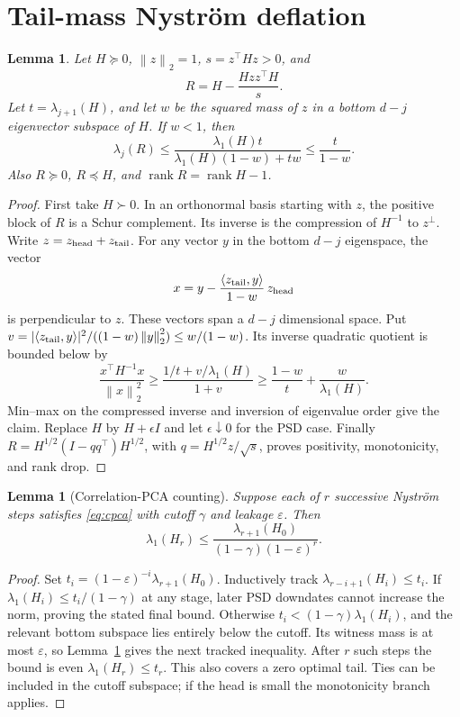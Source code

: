 \documentclass[11pt]{article}
\newtheorem{lemma}[theorem]{Lemma}
\newcommand{\norm}[1]{\left\lVert#1\right\rVert}
\newcommand{\rank}{\operatorname{rank}}
\begin{document}
\section{Tail-mass Nystr\"om deflation}
\begin{lemma}\label{lem:tail}
Let \(H\succeq0\), \(\norm z_2=1\), \(s=z^\top Hz>0\), and
\[
 R=H-\frac{Hzz^\top H}{s}.
\]
Let \(t=\lambda_{j+1}(H)\), and let \(w\) be the squared mass of
\(z\) in a bottom \(d-j\) eigenvector subspace of \(H\).
If \(w<1\), then
\[
 \lambda_j(R)\leq
 \frac{\lambda_1(H)t}{\lambda_1(H)(1-w)+tw}
 \leq\frac{t}{1-w}.
\]
Also \(R\succeq0\), \(R\preceq H\), and
\(\rank R=\rank H-1\).
\end{lemma}
\begin{proof}
First take \(H\succ0\). In an orthonormal basis starting with \(z\),
the positive block of \(R\) is a Schur complement. Its inverse is the
compression of \(H^{-1}\) to \(z^\perp\).
Write \(z=z_{\rm head}+z_{\rm tail}\). For any vector \(y\) in the
bottom \(d-j\) eigenspace, the vector
\[
 x=y-\frac{\langle z_{\rm tail},y\rangle}{1-w}\,z_{\rm head}
\]
is perpendicular to \(z\). These vectors span a \(d-j\) dimensional
space. Put
\(v=|\langle z_{\rm tail},y\rangle|^2/
((1-w)\norm y_2^2)\leq w/(1-w)\).
Its inverse quadratic quotient is bounded below by
\[
 \frac{x^\top H^{-1}x}{\norm x_2^2}
 \geq\frac{1/t+v/\lambda_1(H)}{1+v}
 \geq\frac{1-w}{t}+\frac{w}{\lambda_1(H)}.
\]
Min--max on the compressed inverse and inversion of eigenvalue order
give the claim. Replace \(H\) by \(H+\epsilon I\) and let
\(\epsilon\downarrow0\) for the PSD case.
Finally \(R=H^{1/2}(I-qq^\top)H^{1/2}\), with
\(q=H^{1/2}z/\sqrt s\), proves positivity, monotonicity, and rank drop.
\end{proof}

\begin{lemma}[Correlation-PCA counting]\label{lem:count}
Suppose each of \(r\) successive Nystr\"om steps satisfies
\eqref{eq:cpca} with cutoff \(\gamma\) and leakage \(\varepsilon\).
Then
\[
 \lambda_1(H_r)\leq
 \frac{\lambda_{r+1}(H_0)}
      {(1-\gamma)(1-\varepsilon)^r}.
\]
\end{lemma}
\begin{proof}
Set \(t_i=(1-\varepsilon)^{-i}\lambda_{r+1}(H_0)\).
Inductively track \(\lambda_{r-i+1}(H_i)\leq t_i\).
If \(\lambda_1(H_i)\leq t_i/(1-\gamma)\) at any stage, later
PSD downdates cannot increase the norm, proving the stated final bound.
Otherwise \(t_i<(1-\gamma)\lambda_1(H_i)\), and the relevant bottom
subspace lies entirely below the cutoff.
Its witness mass is at most \(\varepsilon\), so Lemma~\ref{lem:tail}
gives the next tracked inequality.
After \(r\) such steps the bound is even \(\lambda_1(H_r)\leq t_r\).
This also covers a zero optimal tail. Ties can be included in the
cutoff subspace; if the head is small the monotonicity branch applies.
\end{proof}
\end{document}
